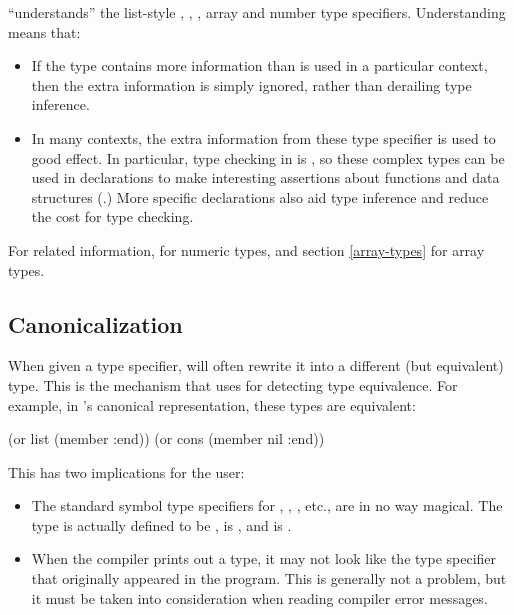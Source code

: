 \python{} ``understands'' the list-style , ,
, array and number type specifiers.  Understanding
means that:
\begin{itemize}
  
\item If the type contains more information than is used in a
  particular context, then the extra information is simply ignored,
  rather than derailing type inference.
  
\item In many contexts, the extra information from these type
  specifier is used to good effect.  In particular, type checking in
  \python{} is , so these complex types can be used
  in declarations to make interesting assertions about functions and
  data structures (.)  More specific
  declarations also aid type inference and reduce the cost for type
  checking.
\end{itemize}

For related information,  for numeric types, and
section \ref{array-types} for array types.


\subsection{Canonicalization}

When given a type specifier, \python{} will often rewrite it into a
different (but equivalent) type.  This is the mechanism that \python{}
uses for detecting type equivalence.  For example, in \python{}'s
canonical representation, these types are equivalent:
\begin{example}
(or list (member :end)) \myequiv (or cons (member nil :end))
\end{example}
This has two implications for the user:
\begin{itemize}
  
\item The standard symbol type specifiers for ,
  , , etc., are in no way magical.  The
   type is actually defined to be ,  is , and
   is .
  
\item When the compiler prints out a type, it may not look like the
  type specifier that originally appeared in the program.  This is
  generally not a problem, but it must be taken into consideration
  when reading compiler error messages.
\end{itemize}


